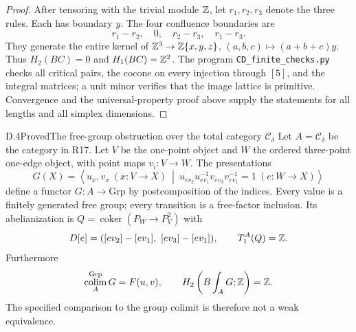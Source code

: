 \begin{proof}
After tensoring with the trivial module $\mathbb Z$, let
$r_1,r_2,r_3$ denote the three rules. Each has boundary $y$.
The four confluence boundaries are
\[
 r_1-r_2,\quad 0,\quad r_2-r_3,\quad r_1-r_3.
\]
They generate the entire kernel of
$\mathbb Z^3\to\mathbb Z\{x,y,z\}$, $(a,b,c)\mapsto(a+b+c)y$.
Thus $H_2(BC)=0$ and $H_1(BC)=\mathbb Z^2$.
The program \texttt{CD\_finite\_checks.py} checks all critical
pairs, the cocone on every injection through $[5]$, and the
integral matrices; a unit minor verifies that the image lattice
is primitive. Convergence and the universal-property proof above
supply the statements for all lengths and all simplex dimensions.
\end{proof}

\begin{claim}{D.4}{Proved}{The free-group obstruction over the total category $\mathcal C_\delta$}
\label{D:predimension}
Let $A=\mathcal C_\delta$ be the category in R17. Let $V$ be
the one-point object and $W$ the ordered three-point one-edge
object, with point maps $v_i:V\to W$. The presentations
\[
 G(X)=\left\langle u_x,v_x\ (x:V\to X)\ \middle|\
 u_{ev_2}u_{ev_1}^{-1}v_{ev_3}v_{ev_1}^{-1}=1
 \ (e:W\to X)\right\rangle
 \tag{D.4.1}
\]
define a functor $G:A\to\mathrm{Grp}$ by postcomposition of
the indices. Every value is a finitely generated free group;
every transition is a free-factor inclusion. Its abelianization
is $Q=\operatorname{coker}(P_W\to P_V^2)$ with
\[
 D[e]=([ev_2]-[ev_1],\ [ev_3]-[ev_1]),
 \qquad T_1^A(Q)=\mathbb Z.
\]
Furthermore
\[
 \operatorname*{colim}_A^{\mathrm{Grp}}G=F(u,v),\qquad
 H_2\left(B\int_A G;\mathbb Z\right)=\mathbb Z.
\]
The specified comparison to the group colimit is therefore not
a weak equivalence.
\end{claim}
